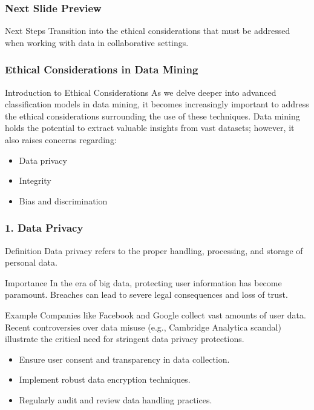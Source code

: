 \documentclass[aspectratio=169]{beamer}
\begin{document}
\begin{frame}[fragile]
    \frametitle{Next Slide Preview}
    \begin{block}{Next Steps}
        Transition into the ethical considerations that must be addressed when working with data in collaborative settings.
    \end{block}
\end{frame}

\begin{frame}[fragile]
    \frametitle{Ethical Considerations in Data Mining}
    \begin{block}{Introduction to Ethical Considerations}
        As we delve deeper into advanced classification models in data mining, it becomes increasingly important to address the ethical considerations surrounding the use of these techniques. 
        Data mining holds the potential to extract valuable insights from vast datasets; however, it also raises concerns regarding:
        \begin{itemize}
            \item Data privacy
            \item Integrity
            \item Bias and discrimination
        \end{itemize}
    \end{block}
\end{frame}

\begin{frame}[fragile]
    \frametitle{1. Data Privacy}
    \begin{block}{Definition}
        Data privacy refers to the proper handling, processing, and storage of personal data.
    \end{block}
    \begin{block}{Importance}
        In the era of big data, protecting user information has become paramount. Breaches can lead to severe legal consequences and loss of trust.
    \end{block}
    \begin{block}{Example}
         Companies like Facebook and Google collect vast amounts of user data. Recent controversies over data misuse (e.g., Cambridge Analytica scandal) illustrate the critical need for stringent data privacy protections.
    \end{block}
    \begin{itemize}
        \item Ensure user consent and transparency in data collection.
        \item Implement robust data encryption techniques.
        \item Regularly audit and review data handling practices.
    \end{itemize}
\end{frame}
\end{document}
